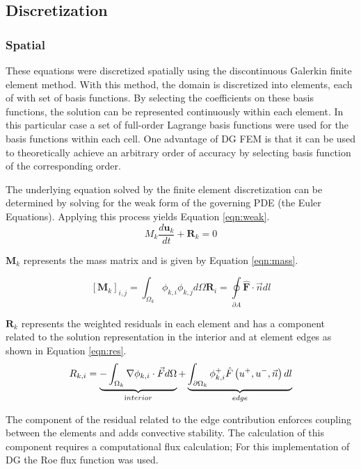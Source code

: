 \documentclass{article}
\begin{document}
\subsection{Discretization}
	\subsubsection{Spatial}
	These equations were discretized spatially using the discontinuous Galerkin finite element method.
	With this method, the domain is discretized into elements, each of with set of basis functions.
	By selecting the coefficients on these basis functions, the solution can be represented continuously within each element.
	In this particular case a set of full-order Lagrange basis functions were used for the basis functions within each cell.
	One advantage of DG FEM is that  it can be used to theoretically achieve an arbitrary order of accuracy by selecting basis function of the corresponding order.

	The underlying equation solved by the finite element discretization can be determined by solving for the weak form of the governing PDE (the Euler Equations).
	Applying this process yields Equation \ref{eqn:weak}.
	\begin{equation}
		M_k\frac{d\mathbf{u}_k}{dt} + \mathbf{R}_k =  0
		\label{eqn:weak}
	\end{equation}


	$\mathbf{M}_{k}$ represents the mass matrix and is given by Equation \ref{eqn:mass}.


	\begin{equation}
		\left[\mathbf{M}_{k}\right]_{i, j}=\int_{\Omega_{k}} \phi_{k, i} \phi_{k, j} d \Omega
		\mathbf{R}_i = \oint\limits_{\partial{A}} \mathbf{\hat{F}} \cdot \vec{n} dl
		\label{eqn:mass}
	\end{equation}

	$\mathbf{R}_k$ represents the weighted residuals in each element and has a component related to the solution representation in the interior and at element edges as shown in Equation \ref{eqn:res}.
	\begin{equation}
		R_{k, i}=\underbrace{-\int_{\Omega_{k}} \nabla \phi_{k, i} \cdot \vec{F} d \Omega}_{\text interior}+ \underbrace{\int_{\partial \Omega_{k}} \phi_{k, i}^{+} \hat{F}\left(u^{+}, u^{-}, \vec{n}\right) dl}_{edge}
		\label{eqn:res}
	\end{equation}

	The component of the residual related to the edge contribution enforces coupling between the elements and adds convective stability.
	The calculation of this component requires a computational flux calculation; For this implementation of DG the Roe flux function was used.
\end{document}
